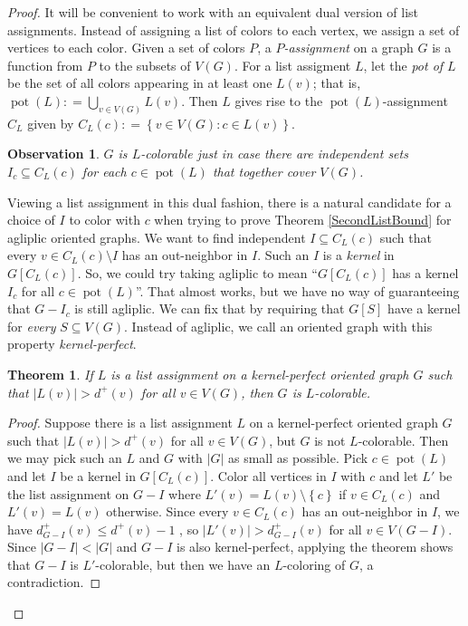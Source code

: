 \documentclass{amsbook}
\theoremstyle{plain}
\newtheorem{observation}{Observation}
\newtheorem{theorem}{Theorem}
\numberwithin{equation}{chapter}
\newcommand{\set}[1]{\left\{ #1 \right\}}
\newcommand{\setb}[3]{\left\{ #1 \in #2 : #3 \right\}}
\newcommand{\card}[1]{\left|#1\right|}
\newcommand{\brackets}[1]{\left[ #1 \right]}
\newcommand{\DefinedAs}{\mathrel{\mathop:}=}
\newcommand{\pot}{\operatorname{pot}}
\begin{document}
\begin{proof}
It will be convenient to work with an equivalent dual version of list assignments.  
Instead of assigning a list of colors to each vertex, we assign a set of vertices to each color.  Given a set of colors $P$, a \emph{$P$-assignment} on a graph $G$ is a function
from $P$ to the subsets of $V(G)$.  For a list assigment $L$, let the \emph{pot of $L$} be the set of all colors appearing in at least one $L(v)$; that is, $\pot(L) \DefinedAs \bigcup_{v \in V(G)} L(v)$.
Then $L$ gives rise to the $\pot(L)$-assignment $C_L$ given by $C_L(c) \DefinedAs \setb{v}{V(G)}{c \in L(v)}$.

\begin{observation}
$G$ is $L$-colorable just in case there are independent sets $I_c \subseteq C_L(c)$ for each $c \in \pot(L)$ that together cover $V(G)$.
\end{observation}

Viewing a list assignment in this dual fashion, there is a natural candidate for a choice of $I$ to color with $c$ when trying to prove Theorem \ref{SecondListBound} for agliplic oriented graphs.
We want to find independent $I \subseteq C_L(c)$ such that every $v \in C_L(c) \setminus I$ has an out-neighbor in $I$.  Such an $I$ is a \emph{kernel} in $G\brackets{C_L(c)}$.  
So, we could try taking agliplic to mean ``$G\brackets{C_L(c)}$ has a kernel $I_c$ for all $c \in \pot(L)$''.  
That almost works, but we have no way of guaranteeing that $G-I_c$ is still agliplic.  We can fix that by requiring that $G[S]$ have a kernel for \emph{every} $S\subseteq V(G)$.  
Instead of agliplic, we call an oriented graph with this property \emph{kernel-perfect}.

\begin{theorem}\label{KernelPerfectListBound}
If $L$ is a list assignment on a kernel-perfect oriented graph $G$ such that $\card{L(v)} > d^+(v)$ for all $v \in V(G)$, then $G$ is $L$-colorable.
\end{theorem}
\begin{proof}
Suppose there is a list assignment $L$ on a kernel-perfect oriented graph $G$ such that $\card{L(v)} > d^+(v)$ for all $v \in V(G)$, but $G$ is not $L$-colorable.  Then
we may pick such an $L$ and $G$ with $\card{G}$ as small as possible.  Pick $c \in \pot(L)$ and let $I$ be a kernel in $G\brackets{C_L(c)}$.  Color all vertices in $I$ with $c$
and let $L'$ be the list assignment on $G-I$ where $L'(v) = L(v) \setminus \set{c}$ if $v \in C_L(c)$ and $L'(v) = L(v)$ otherwise.  
Since every $v \in C_L(c)$ has an out-neighbor in $I$, we have $d_{G-I}^+(v) \le d^+(v) - 1$ , so 
$\card{L'(v)} > d_{G-I}^+(v)$ for all $v \in V(G-I)$.  Since $\card{G-I} < \card{G}$ and $G-I$ is also kernel-perfect, applying the theorem shows that $G-I$ is $L'$-colorable, 
but then we have an $L$-coloring of $G$, a contradiction.
\end{proof}


\end{proof}
\end{document}
